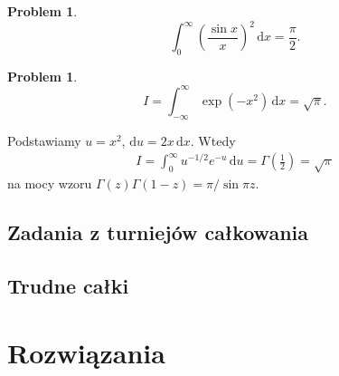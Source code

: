 \documentclass[9pt, twoside, a5paper, fleqn]{extbook}
\newcounter{counter}
\newtheorem{problem}[counter]{Problem}
\theoremstyle{remark}
\begin{document}
\begin{problem}
    \begin{equation}
        \int_0^\infty \left(\frac {\sin x}{x}\right)^2 \,\mathrm{d} x = \frac \pi 2.
    \end{equation}
\end{problem}

\begin{problem}
    \begin{equation}
        I = \int_{-\infty}^\infty \exp \left( -x^2 \right) \,\mathrm{d} x = \sqrt{\pi}.
    \end{equation}
\end{problem}

Podstawiamy $u = x^2$, $\mathrm{d} u = 2x \,\mathrm{d}x$.
Wtedy
\begin{align}
	I = \int_0^\infty u^{-1/2} e^{-u}\,\mathrm{d}u = \Gamma \left(\frac 12\right) = \sqrt{\pi}
\end{align}
na mocy wzoru $\Gamma (z) \Gamma(1-z) = \pi/\sin \pi z$.


	

\section{Zadania z turniejów całkowania}
	



\section{Trudne całki}
	
	
	

\chapter{Rozwiązania}
% 

% 
% 
% 

\end{document}
